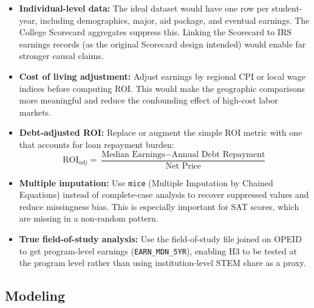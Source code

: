 \documentclass[12pt, letterpaper]{article}
\begin{document}
\begin{itemize}
  \item \textbf{Individual-level data:} The ideal dataset would have one row per student-year, including demographics, major, aid package, and eventual earnings. The College Scorecard aggregates suppress this. Linking the Scorecard to IRS earnings records (as the original Scorecard design intended) would enable far stronger causal claims.

  \item \textbf{Cost of living adjustment:} Adjust earnings by regional CPI or local wage indices before computing ROI. This would make the geographic comparisons more meaningful and reduce the confounding effect of high-cost labor markets.

  \item \textbf{Debt-adjusted ROI:} Replace or augment the simple ROI metric with one that accounts for loan repayment burden:
    \[
    \text{ROI}_{adj} = \frac{\text{Median Earnings} - \text{Annual Debt Repayment}}{\text{Net Price}}
    \]

  \item \textbf{Multiple imputation:} Use \texttt{mice} (Multiple Imputation by Chained Equations) instead of complete-case analysis to recover suppressed values and reduce missingness bias. This is especially important for SAT scores, which are missing in a non-random pattern.

  \item \textbf{True field-of-study analysis:} Use the field-of-study file joined on OPEID to get program-level earnings (\texttt{EARN\_MDN\_5YR}), enabling H3 to be tested at the program level rather than using institution-level STEM share as a proxy.
\end{itemize}

\subsection{Modeling}
\end{document}
